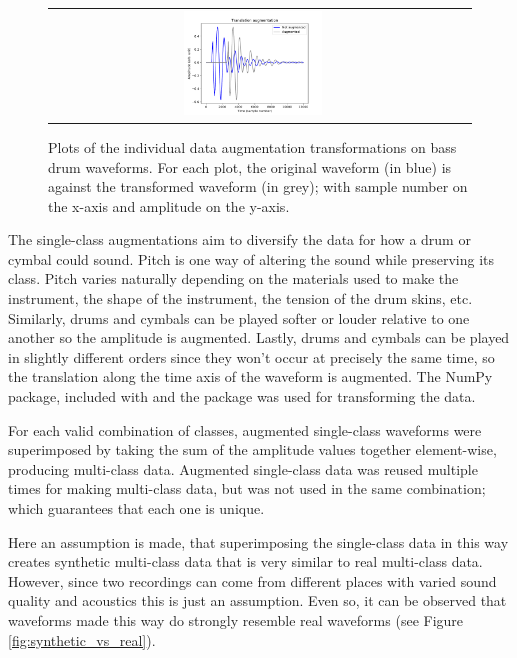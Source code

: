 \documentclass[12pt]{article}
\begin{document}
\begin{figure}[H]
\begin{tabular}{c|c}
            \includegraphics[width=0.35\textwidth]{figures/translationAugmentation.pdf}& \\
        \end{tabular}
    \caption{\footnotesize{Plots of the individual data augmentation transformations on bass drum waveforms. For each plot, the original waveform (in blue) is against the transformed waveform (in grey); with sample number on the x-axis and amplitude on the y-axis.}}
    \label{fig:augmentations}
    \end{figure}
    
    The single-class augmentations aim to diversify the data for how a drum or cymbal could sound. Pitch is one way of altering the sound while preserving its class. Pitch varies naturally depending on the materials used to make the instrument, the shape of the instrument, the tension of the drum skins, etc. Similarly, drums and cymbals can be played softer or louder relative to one another so the amplitude is augmented. Lastly, drums and cymbals can be played in slightly different orders since they won't occur at precisely the same time, so the translation along the time axis of the waveform is augmented. The NumPy package, included with \textcite{SciPy} and the \textcite{Librosa} package was used for transforming the data.\medskip
    
    For each valid combination of classes, augmented single-class waveforms were superimposed by taking the sum of the amplitude values together element-wise, producing multi-class data. Augmented single-class data was reused multiple times for making multi-class data, but was not used in the same combination; which guarantees that each one is unique.\medskip
    
    Here an assumption is made, that superimposing the single-class data in this way creates synthetic multi-class data that is very similar to real multi-class data. However, since two recordings can come from different places with varied sound quality and acoustics this is just an assumption. Even so, it can be observed that waveforms made this way do strongly resemble real waveforms (see Figure \ref{fig:synthetic_vs_real}).\medskip
    
\end{document}

